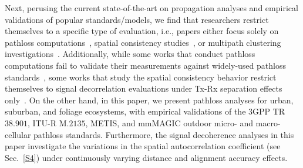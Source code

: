 \documentclass[10pt, twocolumn]{IEEEtran}
\begin{document}
Next, perusing the current state-of-the-art on propagation analyses and empirical validations of popular standards/models, we find that researchers restrict themselves to a specific type of evaluation, i.e., papers either focus solely on pathloss computations~\cite{Qualcomm3GPP, MacCartneyModelsOverview, FoliageSimulations, SuburbanGeometryJournal}, spatial consistency studies~\cite{SpatialConsistencyOriginal}, or multipath clustering investigations~\cite{QDC_NIST, D2DHumanBlockage}. Additionally, while some works that conduct pathloss computations fail to validate their measurements against widely-used pathloss standards~\cite{FoliageSimulations, SuburbanGeometryJournal}, some works that study the spatial consistency behavior restrict themselves to signal decorrelation evaluations under Tx-Rx separation effects only~\cite{SpatialConsistencyOriginal, MacCartneyRural, SpatialDynamics}. On the other hand, in this paper, we present pathloss analyses for urban, suburban, and foliage ecosystems, with empirical validations of the $3$GPP TR$38.901$, ITU-R M$.2135$, METIS, and mmMAGIC outdoor micro- and macro-cellular pathloss standards. Furthermore, the signal decoherence analyses in this paper investigate the variations in the spatial autocorrelation coefficient (see Sec.~\ref{S4}) under continuously varying distance and alignment accuracy effects.
\end{document}
